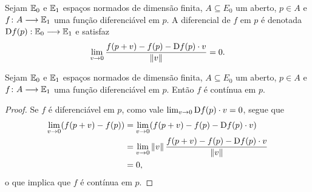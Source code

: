 \begin{nota}
Sejam $\mathbb{E}_0$ e $\mathbb{E}_1$ espaços normados de dimensão finita, $A \subseteq E_0$ um aberto, $p \in A$ e $f\colon A \longrightarrow \mathbb{E}_1$ uma função diferenciável em $p$. A diferencial de $f$ em $p$ é denotada $\mathrm{D} f(p): \mathbb{E}_0 \longrightarrow \mathbb{E}_1$ e satisfaz
	\begin{equation*}
	\lim_{v \rightarrow 0} \frac{f(p+v) - f(p) - \mathrm{D} f(p) \cdot v}{\left\Vert{v}\right\Vert} = 0.
	\end{equation*}
\end{nota}

\begin{prop}
Sejam $\mathbb{E}_0$ e $\mathbb{E}_1$ espaços normados de dimensão finita, $A \subseteq E_0$ um aberto, $p \in A$ e $f\colon A \longrightarrow \mathbb{E}_1$ uma função diferenciável em $p$. Então $f$ é contínua em $p$.
\end{prop}
\begin{proof}
Se $f$ é diferenciável em $p$, como vale $\lim_{v \rightarrow 0}\mathrm{D} f(p) \cdot v = 0$, segue que
	\begin{align*}
	\lim_{v \rightarrow 0} (f(p+v)-f(p)) &= \lim_{v \rightarrow 0}(f(p+v)-f(p)-\mathrm{D} f(p) \cdot v) \\
		&= \lim_{v \rightarrow 0}\left\Vert{v}\right\Vert \frac{f(p+v)-f(p)-\mathrm{D} f(p) \cdot v}{\left\Vert{v}\right\Vert} \\
		&= 0,
	\end{align*}
o que implica que $f$ é contínua em $p$.
\end{proof}


